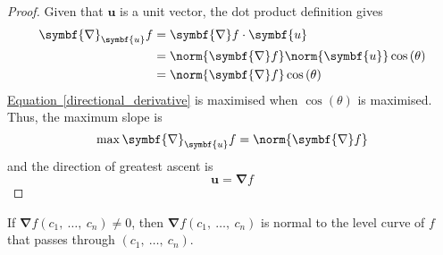 \documentclass{article}
\begin{document}
\begin{proof}
    Given that \(\symbf{u}\) is a unit vector, the dot product
    definition gives
    \begin{align}
        \symbf{\nabla}_{\symbf{u}}f & = \symbf{\nabla}f \cdot \symbf{u} \nonumber                                         \\
                                    & = \norm{\symbf{\nabla}f} \norm{\symbf{u}} \cos{\left( \theta \right)} \nonumber     \\
                                    & = \norm{\symbf{\nabla}f} \cos{\left( \theta \right)} \label{directional_derivative}
    \end{align}
    \hyperref[directional_derivative]{Equation~\ref{directional_derivative}}
    is maximised when \(\cos{\left( \theta \right)}\) is maximised. Thus,
    the maximum slope is
    \begin{equation*}
        \max \symbf{\nabla}_{\symbf{u}}f = \norm{\symbf{\nabla}f}
    \end{equation*}
    and the direction of greatest ascent is
    \begin{equation*}
        \symbf{u} = \symbf{\nabla}f
    \end{equation*}
\end{proof}
\begin{theorem}
    If \(\symbf{\nabla}f\left( c_1,\: \ldots,\: c_n \right) \neq 0\), then \(\symbf{\nabla}f\left( c_1,\: \ldots,\: c_n \right)\) is normal to the level
    curve of \(f\) that passes through \(\left( c_1,\: \ldots,\: c_n \right)\).
\end{theorem}
\end{document}
